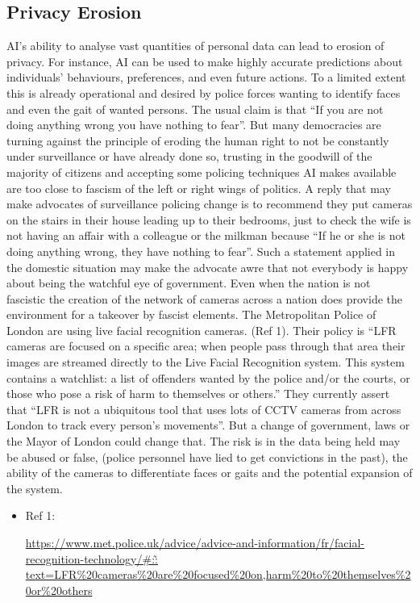 \subsection{Privacy Erosion}
AI's ability to analyse vast quantities of personal data can lead to erosion of privacy. For instance, AI can be used to make highly accurate predictions about individuals’ behaviours, preferences, and even future actions. To a limited extent this is already operational and desired by police forces wanting to identify faces and even the gait of wanted persons. The usual claim is that “If you are not doing anything wrong you have nothing to fear”. But many democracies are turning against the principle of eroding the human right to not  be constantly under surveillance or have already done so, trusting in the goodwill of the majority of citizens and accepting some policing techniques AI makes available are too close to fascism of the left or right wings of politics. A reply that may make advocates of surveillance policing change is to recommend they put cameras on the stairs in their house leading up to their bedrooms, just to check the wife is not having an affair with a colleague or the milkman because “If he or she is not doing anything wrong, they have nothing to fear”. Such a statement applied in the domestic situation may make the advocate awre that not everybody is happy about being the watchful eye of government. Even when the nation is not fascistic the creation of the network of cameras across a nation does provide the environment for a takeover by fascist elements. The Metropolitan Police  of London are using live facial recognition cameras. (Ref 1). Their policy is  “LFR cameras are focused on a specific area; when people pass through that area their images are streamed directly to the Live Facial Recognition system. This system contains a watchlist: a list of offenders wanted by the police and/or the courts, or those who pose a risk of harm to themselves or others.”  They currently assert that “LFR is not a ubiquitous tool that uses lots of CCTV cameras from across London to track every person’s movements”.  But a change of government, laws or the Mayor of London could change that. The risk is in the data being held may be abused or false, (police personnel have lied to get convictions in the past), the ability of the cameras to differentiate faces or gaits and the potential expansion of the system.

\begin{itemize}
\item Ref 1: \raggedright{\href{https://www.met.police.uk/advice/advice-and-information/fr/facial-recognition-technology/#:~:text=LFR\%20cameras\%20are\%20focused\%20on,harm\%20to\%20themselves\%20or\%20others}{https://www.met.police.uk/advice/advice-and-information/fr/facial-recognition-technology/\#:\~: text=LFR\%20cameras\%20are\%20focused\%20on,harm\%20to\%20themselves\%20or\%20others}}
\end{itemize}

